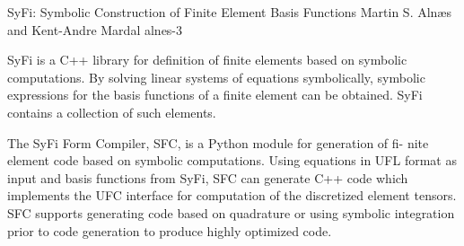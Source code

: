              {SyFi: Symbolic Construction of Finite Element Basis Functions}
              {Martin S. Aln\ae{}s and Kent-Andre Mardal}
              {alnes-3}

SyFi is a C++ library for definition of finite elements based on
symbolic computations. By solving linear systems of equations
symbolically, symbolic expressions for the basis functions of a finite
element can be obtained. SyFi contains a collection of such elements.

The SyFi Form Compiler, SFC, is a Python module for generation of fi-
nite element code based on symbolic computations. Using equations in
UFL format as input and basis functions from SyFi, SFC can generate
C++ code which implements the UFC interface for computation of the
discretized element tensors. SFC supports generating code based on
quadrature or using symbolic integration prior to code generation to
produce highly optimized code.
